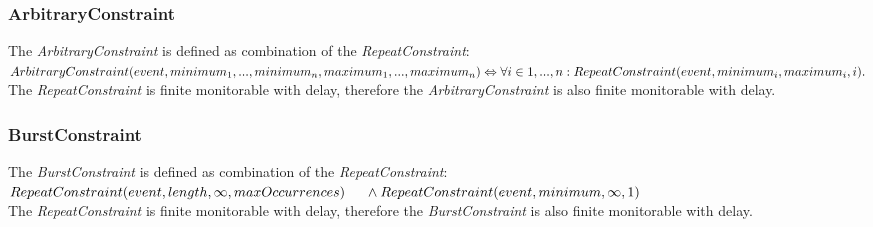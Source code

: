 \subsubsection{ArbitraryConstraint}
	The \emph{ArbitraryConstraint} is defined as combination of the \emph{RepeatConstraint}:\\[10pt]
	\begin{math}
		ArbitraryConstraint(event, minimum_1, ..., minimum_n, maximum_1, ..., maximum_n)\\
		\Leftrightarrow \forall i\in{1, ..., n}: RepeatConstraint(event, minimum_i, maximum_i, i).
	\end{math}\\[10pt]
	The \emph{RepeatConstraint} is finite monitorable with delay, therefore the \emph{ArbitraryConstraint} is also finite monitorable with delay.
	
\subsubsection{BurstConstraint}
	The \emph{BurstConstraint} is defined as combination of the \emph{RepeatConstraint}:\\[10pt]
	\begin{math}
		RepeatConstraint(event, length, \infty, maxOccurrences)\\
		\text{\hspace{.5cm}}\land RepeatConstraint(event, minimum, \infty, 1)
	\end{math}\\[10pt]
	The \emph{RepeatConstraint} is finite monitorable with delay, therefore the \emph{BurstConstraint} is also finite monitorable with delay.
	

